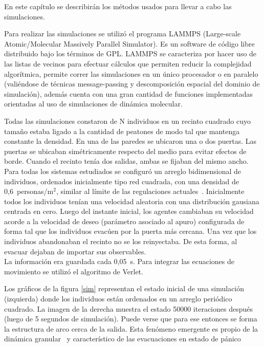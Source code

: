 
En este capítulo se describirán los métodos usados para llevar a cabo las simulaciones. 

Para realizar las simulaciones se utilizó el programa LAMMPS (Large-scale Atomic/Molecular Massively Parallel Simulator).
Es un software de código libre distribuido bajo los términos de GPL.
LAMMPS se caracteriza por hacer uso de las listas de vecinos para efectuar cálculos que permiten reducir la 
complejidad algorítmica, permite correr las simulaciones en un único procesador o en paralelo (valiéndose de técnicas message-passing y descomposición espacial del dominio de simulación), además cuenta con una gran cantidad de funciones implementadas orientadas al uso de simulaciones de dinámica molecular. 

Todas las simulaciones constaron de N individuos en un recinto cuadrado cuyo tamaño estaba ligado a la cantidad de
peatones de modo tal que mantenga constante la densidad. En una de las paredes se ubicaron una o dos puertas. Las puertas se ubicaban simétricamente respecto del medio para evitar efectos de borde. Cuando el recinto tenía dos salidas, ambas se fijaban del mismo ancho.
Para todas los sistemas estudiados se configuró un arreglo bidimensional de individuos, ordenados inicialmente tipo
red cuadrada, con una densidad de 0,6~personas/m$^2$, similar al límite de las regulaciones actuales~\cite{mysen}. Inicialmente todos los individuos tenían una velocidad aleatoria con una distribución gausiana centrada en cero.  Luego del instante inicial, los agentes cambiaban su velocidad acorde a la velocidad de deseo (parámetro asociado al apuro) configurada de forma tal que los individuos evacúen por la puerta más cercana. Una vez que los individuos abandonaban el recinto no se los reinyectaba. De esta forma, al evacuar dejaban de importar sus observables. \\
La información era guardada cada 0,05~s. 
Para integrar las ecuaciones de movimiento se utilizó el algoritmo de Verlet. 

Los gráficos de la figura \ref{sim} representan el estado inicial de una simulación (izquierda) donde los individuos están ordenados en un arreglo periódico cuadrado. La imagen de la derecha muestra el estado 50000 iteraciones después (luego de 5 segundos de simulación). Puede verse que para ese entonces se forma la estructura de arco cerca de la salida. Esta fenómeno emergente es propio de la dinámica granular~\cite{To} y característico de las evacuaciones en estado de pánico~\cite{Helbing1}  

